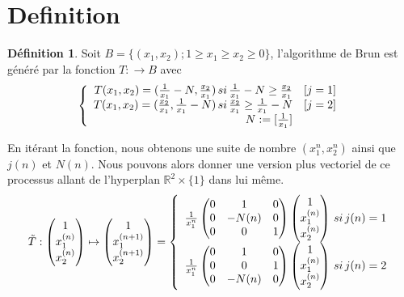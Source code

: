 \documentclass[12pt]{article}
\theoremstyle{plain}%
\theoremstyle{definition}
\newtheorem{dfnt}{Définition}[section]
\theoremstyle{remark}
\begin{document}
\section{Definition}

\begin{dfnt}
Soit $B=\{(x_1,x_2); 1 \geq x_1 \geq x_2 \geq 0\}$, l'algorithme de Brun est généré par la fonction $T: \to B$ avec
$$
\left \{
\begin{array}{r c }
T(x_1,x_2)=(\frac{1}{x_1}-N,\frac{x_2}{x_1}) \, si \, \frac{1}{x_1}-N \geq \frac{x_2}{x_1} & [j=1] \\
T(x_1,x_2)=(\frac{x_2}{x_1},\frac{1}{x_1}-N) \, si \, \frac{x_2}{x_1} \geq  \frac{1}{x_1}-N & [j=2] \\
N:=[\frac{1}{x_1}]
\end{array}
\right .
$$
\end{dfnt}
En itérant la fonction, nous obtenons une suite de nombre $(x_1^n,x_2^n)$ ainsi que $j(n)$ et $N(n)$.
Nous pouvons alors donner une version plus vectoriel de ce processus allant de l'hyperplan $\mathbb{R}^2 \times \{1 \} $ dans lui même.
$$
\tilde{T}:\begin{pmatrix} 1 \\ x_1^{(n)} \\ x_2^{(n)} \end{pmatrix} \mapsto \begin{pmatrix} 1 \\ x_1^{(n+1)} \\ x_2^{(n+1)} \end{pmatrix} = \left \{
\begin{array}{r c}
\frac{1}{x_1^n}\begin{pmatrix} 0 & 1 & 0 \\0 & -N(n) & 0 \\0 & 0& 1 \end{pmatrix} \begin{pmatrix} 1 \\ x_1^{(n)} \\ x_2^{(n)} \end{pmatrix} \, si \, j(n)=1\\
\frac{1}{x_1^n}\begin{pmatrix} 0 & 1 & 0 \\0 & 0 & 1 \\0 & -N(n) & 0 \end{pmatrix} \begin{pmatrix} 1 \\ x_1^{(n)} \\ x_2^{(n)} \end{pmatrix}\, si \, j(n)=2\\
\end{array}
\right .
$$
\end{document}
